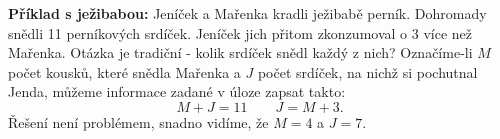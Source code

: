 \begin{mdframed}[style=mdexam]
  \begin{example}\label{mai:exam005}
    \textbf{Příklad s ježibabou:}\newline
    Jeníček a Mařenka kradli ježibabě perník. Dohromady snědli \num{11} perníkových srdíček. Jeníček
    jich přitom zkonzumoval o \num{3} více než Mařenka. Otázka je tradiční - kolik srdíček snědl
    každý z nich? Označíme-li \(M\) počet kousků, které snědla Mařenka a \(J\) počet srdíček, na
    nichž si pochutnal Jenda, můžeme informace zadané v úloze zapsat takto:
      \begin{equation*}
        M + J = 11 \qquad J = M + 3.
      \end{equation*}
    Řešení není problémem, snadno vidíme, že \(M = 4\) a \(J = 7\).
  \end{example}
\end{mdframed}